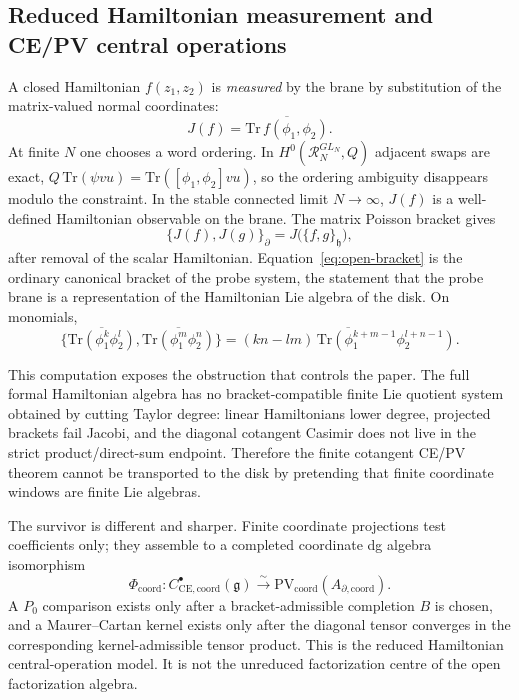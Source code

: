 \documentclass[11pt]{memoir}
\begin{document}
\subsection{Reduced Hamiltonian measurement and CE/PV central operations}

A closed Hamiltonian $f(z_1,z_2)$ is \emph{measured} by the brane by
substitution of the matrix-valued normal coordinates:
$$J(f)=\overline{\mathrm{Tr}\,f(\phi_1,\phi_2)}.$$
At finite $N$ one chooses a word ordering. In $H^0(\mathcal R_N^{GL_N},Q)$
adjacent swaps are exact,
$Q\,\mathrm{Tr}(\psi vu)=\mathrm{Tr}([\phi_1,\phi_2]vu)$, so the ordering
ambiguity disappears modulo the constraint. In the stable connected limit
$N\to\infty$, $J(f)$ is a well-defined Hamiltonian observable on the brane.
The matrix Poisson bracket gives
\begin{equation}\label{eq:open-bracket}
\bigl\{J(f),J(g)\bigr\}_\partial=J\bigl(\{f,g\}_{\mathfrak h}\bigr),
\end{equation}
after removal of the scalar Hamiltonian. Equation~\eqref{eq:open-bracket} is
the ordinary canonical bracket of the probe system, the statement that the
probe brane is a representation of the Hamiltonian Lie algebra of the disk. On monomials,
\begin{equation}\label{eq:bracket-coefficient}
\bigl\{\overline{\mathrm{Tr}(\phi_1^k\phi_2^l)},
       \overline{\mathrm{Tr}(\phi_1^m\phi_2^n)}\bigr\}
  =\overline{(kn-lm)\,\mathrm{Tr}(\phi_1^{k+m-1}\phi_2^{l+n-1})}.
\end{equation}

This computation exposes the obstruction that controls the paper.  The
full formal Hamiltonian algebra has no bracket-compatible finite Lie
quotient system obtained by cutting Taylor degree: linear Hamiltonians
lower degree, projected brackets fail Jacobi, and the diagonal
cotangent Casimir does not live in the strict product/direct-sum
endpoint.  Therefore the finite cotangent CE/PV theorem cannot be
transported to the disk by pretending that finite coordinate windows are
finite Lie algebras.

The survivor is different and sharper.  Finite coordinate projections
test coefficients only; they assemble to a completed coordinate dg
algebra isomorphism
\[
  \Phi_{\mathrm{coord}}\colon
  C^\bullet_{\mathrm{CE},\mathrm{coord}}(\mathfrak g)
  \xrightarrow{\sim}
  \mathrm{PV}_{\mathrm{coord}}(A_{\partial,\mathrm{coord}}).
\]
A \(P_0\) comparison exists only after a bracket-admissible completion
\(B\) is chosen, and a Maurer--Cartan kernel exists only after the
diagonal tensor converges in the corresponding kernel-admissible tensor
product.  This is the reduced Hamiltonian central-operation model.  It
is not the unreduced factorization centre of the open factorization
algebra.
\end{document}
